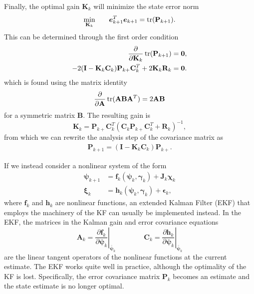 Finally, the optimal gain $\mathbf{K}_k$ will minimize the state error norm
\begin{equation}
\underset{\mathbf{K}_k}{\mathrm{min}} \qquad \boldsymbol{e}_{k+1}^T\boldsymbol{e}_{k+1} = \operatorname{tr}(\mathbf{P}_{k+1}).
\end{equation}
This can be determined through the first order condition
\begin{align}
\frac{\partial }{\partial \mathbf{K}_k} \operatorname{tr}(\mathbf{P}_{k+1}) &= \mathbf{0},\\
- 2(\mathbf{I} - \mathbf{K}_k\mathbf{C}_k) \mathbf{P}_{k+} \mathbf{C}_k^T + 2 \mathbf{K}_k \mathbf{R}_k &= \mathbf{0}.
\end{align}
which is found using the matrix identity~\cite{Gelb1974a}
\begin{equation}
\frac{\partial}{\partial \mathbf{A}} \operatorname{tr}(\mathbf{A} \mathbf{B} \mathbf{A}^T) = 2 \mathbf{A} \mathbf{B}
\end{equation}
for a symmetric matrix $\mathbf{B}$. The resulting gain is
\begin{equation}
\label{eq:kalman_gain}
\mathbf{K}_k = \mathbf{P}_{k+} \mathbf{C}_k^T\left( \mathbf{C}_k \mathbf{P}_{k+}\mathbf{C}_k^T + \mathbf{R}_k\right)^{-1},
\end{equation}
from which we can rewrite the analysis step of the covariance matrix as~\cite{Gelb1974a}
\begin{equation}
\begin{split}
\mathbf{P}_{k+1} =  (\mathbf{I} - \mathbf{K}_k\mathbf{C}_k) \mathbf{P}_{k+}.
\end{split}
\end{equation}

If we instead consider a nonlinear system of the form
\begin{align}
\label{eq:nonlinear_plant1}
\boldsymbol{\psi}_{k+1} &= \mathbf{f}_k (\boldsymbol{\psi}_k,  \boldsymbol{\gamma}_k) + \mathbf{J}_k\boldsymbol{\chi}_k \\
\label{eq:nonlinear_plant2}
\boldsymbol{\xi}_k &= \mathbf{h}_k (\boldsymbol{\psi}_k,  \boldsymbol{\gamma}_k) + \boldsymbol{\epsilon}_k,
\end{align}
where $\mathbf{f}_k$ and $\mathbf{h}_k$ are nonlinear functions, an extended Kalman Filter (EKF) that employs the machinery of the KF can usually be implemented instead. In the EKF, the matrices in the Kalman gain and error covariance equations 
\begin{equation}
\mathbf{A}_k = \left. \frac{\partial  \mathbf{f}_k}{\partial \boldsymbol{\psi}_k}\right\vert_{\bar{\boldsymbol{\psi}}_k} \qquad \qquad \mathbf{C}_k = \left. \frac{\partial  \mathbf{h}_k}{\partial \boldsymbol{\psi}_k}\right\vert_{\bar{\boldsymbol{\psi}}_k} 
\end{equation}
are the linear tangent operators of the nonlinear functions at the current estimate. The EKF works quite well in practice, although the optimality of the KF is lost. Specifically, the error covariance matrix $\mathbf{P}_k$ becomes an estimate and the state estimate is no longer optimal.

